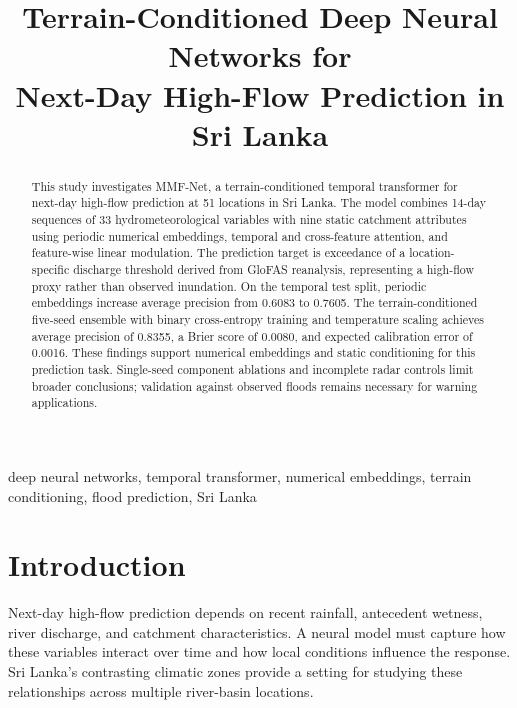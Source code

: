 \documentclass[conference]{IEEEtran}
\begin{document}
\title{Terrain-Conditioned Deep Neural Networks for\\Next-Day High-Flow Prediction in Sri Lanka}

\author{%
}

\maketitle

\begin{abstract}
This study investigates MMF-Net, a terrain-conditioned temporal
transformer for next-day high-flow prediction at 51 locations in
Sri Lanka. The model combines 14-day sequences of 33
hydrometeorological variables with nine static catchment attributes
using periodic numerical embeddings, temporal and cross-feature
attention, and feature-wise linear modulation. The prediction target
is exceedance of a location-specific discharge threshold derived
from GloFAS reanalysis, representing a high-flow proxy rather than
observed inundation. On the temporal test split, periodic embeddings
increase average precision from 0.6083 to 0.7605. The
terrain-conditioned five-seed ensemble with binary cross-entropy
training and temperature scaling achieves average precision of
0.8355, a Brier score of 0.0080, and expected calibration error of
0.0016. These findings support numerical embeddings and static
conditioning for this prediction task. Single-seed component
ablations and incomplete radar controls limit broader conclusions;
validation against observed floods remains necessary for warning
applications.
\end{abstract}
\begin{IEEEkeywords}
deep neural networks, temporal transformer, numerical embeddings,
terrain conditioning, flood prediction, Sri Lanka
\end{IEEEkeywords}

\section{Introduction}
Next-day high-flow prediction depends on recent rainfall,
antecedent wetness, river discharge, and catchment characteristics.
A neural model must capture how these variables interact over time
and how local conditions influence the response. Sri Lanka's
contrasting climatic zones provide a setting for studying these
relationships across multiple river-basin locations.
\end{document}
